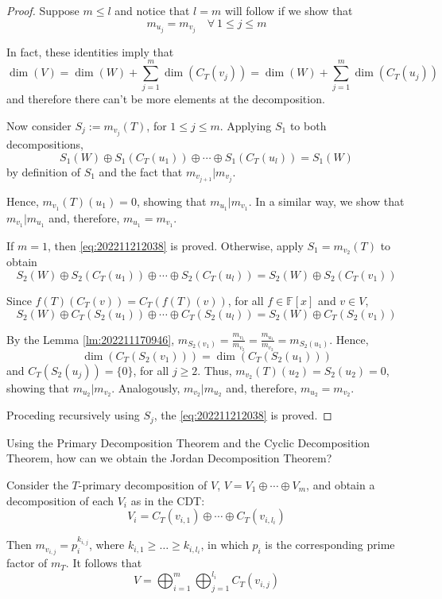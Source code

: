 \begin{proof}
	Suppose $m \leq l$ and notice that $l = m$ will follow if we show that 
	\begin{equation}
		m_{u_j} = m_{v_j} \quad \forall~1 \leq j \leq m
	 \label{eq:202211212038}
	\end{equation}
	
	In fact, these identities imply that
	\[
		\dim(V) = \dim(W) + \sum_{j=1}^m \dim(C_T(v_j)) = \dim(W) + \sum_{j=1}^m \dim(C_T(u_j))
	\]
  and therefore there can't be more elements at the decomposition. 

  Now consider $S_j := m_{v_j}(T)$, for $1 \leq j \leq m$. Applying $S_1$ to both decompositions, 
  \[
    S_1(W) \oplus S_1(C_T(u_1)) \oplus \cdots \oplus S_1(C_T(u_l)) = S_1(W)
  \]
  by definition of $S_1$ and the fact that $m_{v_{j+1}} | m_{v_j}$.

  Hence, $m_{v_1}(T)(u_1) = 0$, showing that $m_{u_1} | m_{v_1}$. In a similar way, we show that $m_{v_1} | m_{u_1}$ and, therefore, $m_{u_1} = m_{v_1}$.

  If $m = 1$, then \eqref{eq:202211212038} is proved. Otherwise, apply $S_1 = m_{v_2}(T)$ to obtain 
  \[
    S_2(W) \oplus S_2(C_T(u_1)) \oplus \cdots \oplus S_2(C_T(u_l)) = S_2(W) \oplus S_2(C_T(v_1)) 
  \]

  Since $f(T)(C_T(v)) = C_T(f(T)(v))$, for all $f \in \mathbb{F}[x]$ and $v \in V$,
  \[
    S_2(W) \oplus C_T(S_2(u_1)) \oplus \cdots \oplus C_T(S_2(u_l)) = S_2(W) \oplus C_T(S_2(v_1))
  \]

  By the Lemma \ref{lm:202211170946}, $m_{S_2(v_1)} = \frac{m_{v_1}}{m_{v_2}} = \frac{m_{u_1}}{m_{v_2}} = m_{S_2(u_1)}$. Hence, 
  \[
    \dim(C_T(S_2(v_1))) = \dim(C_T(S_2(u_1)))
  \]
  and $C_T(S_2(u_j)) = \{ 0 \}$, for all $j \geq 2$. Thus, $m_{v_2}(T)(u_2) = S_2(u_2) = 0$, showing that $m_{u_2} | m_{v_2}$. Analogously, $m_{v_2} | m_{u_2}$ and, therefore, $m_{u_2} = m_{v_2}$. 

  Proceding recursively using $S_j$, the \eqref{eq:202211212038} is proved.
\end{proof}

Using the Primary Decomposition Theorem and the Cyclic Decomposition Theorem, how can we obtain the Jordan Decomposition Theorem? 

Consider the $T$-primary decomposition of $V$, $V = V_1 \oplus \cdots \oplus V_m$, and obtain a decomposition of each $V_i$ as in the CDT: 
\[
  V_i = C_T(v_{i,1}) \oplus \cdots \oplus C_T(v_{i,l_i})
\]

Then $m_{v_{i,j}} = p_i^{k_{i,j}}$, where $k_{i,1} \geq \ldots \geq k_{i,l_i}$, in which $p_i$ is the corresponding prime factor of $m_T$. It follows that
\[
  V = \bigoplus_{i=1}^m \bigoplus_{j=1}^{l_i} C_T(v_{i,j})
\]  

